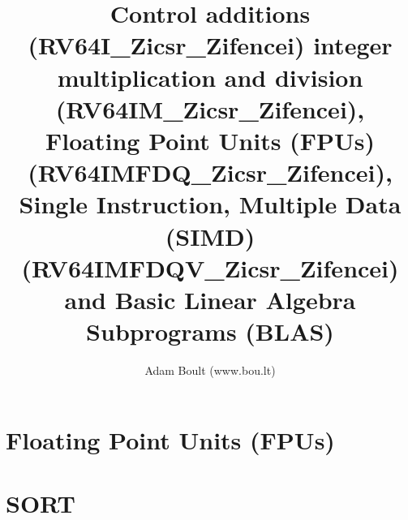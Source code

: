 \documentclass[oneside]{book}
\begin{document}
\author{Adam Boult (www.bou.lt)}
\title{Control additions (RV64I\_Zicsr\_Zifencei) integer multiplication and division (RV64IM\_Zicsr\_Zifencei), Floating Point Units (FPUs) (RV64IMFDQ\_Zicsr\_Zifencei), Single Instruction, Multiple Data (SIMD) (RV64IMFDQV\_Zicsr\_Zifencei) and Basic Linear Algebra Subprograms (BLAS)}
\maketitle

\setcounter{tocdepth}{0}
\tableofcontents



\part{Floating Point Units (FPUs)}

\part{SORT}

\end{document}

